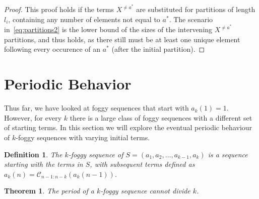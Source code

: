 \documentclass{article}
\newtheorem{theorem}{Theorem}
\newtheorem{definition}{Definition}
\begin{document}
\begin{proof}
This proof holds if the terms $X^{\neq a^*}$ are substituted for partitions of length $l_i$, containing any number of elements not equal to $a^*$. The scenario in~\eqref{eq:partitions2} is the lower bound of the sizes of the intervening $X^{\neq a^*}$ partitions, and thus holds, as there still must be at least one unique element following every occurence of an $a^*$ (after the initial partition). 
\end{proof}

\section{Periodic Behavior}\label{sec:periodic-behavior}

Thus far, we have looked at foggy sequences that start with $a_k(1) = 1$. However, for every $k$ there is a large class of foggy sequences with a different set of starting terms. In this section we will explore the eventual periodic behaviour of $k$-foggy sequences with varying initial terms.

\begin{definition}
	The $k$-foggy sequence of $S = (a_1, a_2,\dots, a_{k-1}, a_k)$ is a sequence starting with the terms in $S$, with subsequent terms defined as $a_k(n) = \mathcal{C}_{n-1:n-k}(a_k(n-1))$.
	\label{def:k-foggy-of-s}
\end{definition}


\begin{theorem}
	The period of a $k$-foggy sequence cannot divide $k$.
	\label{thm:periodDividesK}
\end{theorem}
\end{document}
